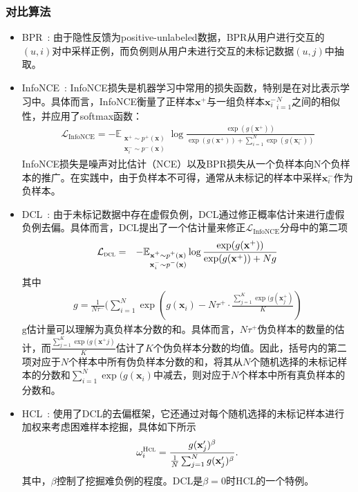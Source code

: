 \subsubsection{对比算法}
\begin{itemize}
	\item BPR~\cite{Steffen:2009:UAI}: 由于隐性反馈为positive-unlabeled数据，BPR从用户进行交互的$(u,i)$对中采样正例，而负例则从用户未进行交互的未标记数据$(u,j)$中抽取。
	\item InfoNCE~\cite{Oord:2018:arxiv}: 
	InfoNCE损失是机器学习中常用的损失函数，特别是在对比表示学习中。具体而言，InfoNCE衡量了正样本$\mathbf{x}^+$与一组负样本${\mathbf{x}_i^-}_{i=1}^N$之间的相似性，并应用了softmax函数：
	\begin{eqnarray}\label{eq:Info}
		\mathcal{L}_\text{InfoNCE} =  - \mathbb{E}_{\substack{\mathbf x^+ \sim p^+(\mathbf x) \\ \mathbf x_i^- \sim p^-(\mathbf x)}} \log\frac{\exp(g(\mathbf{x}^+))}{\exp(g(\mathbf{x}^+))+ \sum_{i=1}^{N}\exp( g(\mathbf{x}_i^-))} \nonumber
	\end{eqnarray}
	InfoNCE损失是噪声对比估计（NCE）以及BPR损失从一个负样本向N个负样本的推广。在实践中，由于负样本不可得，通常从未标记的样本中采样$\mathbf{x}_i^-$作为负样本。
	\item DCL~\cite{Chuang:2020:NIPS}: 由于未标记数据中存在虚假负例，DCL通过修正概率估计来进行虚假负例去偏。具体而言，DCL提出了一个估计量来修正$\mathcal{L}_\text{InfoNCE}$分母中的第二项 
	\begin{eqnarray}\label{eq:DCL}
		\mathcal{L}_\textsc{dcl} 
		&=&  - \mathbb{E}_{\substack{\mathbf x^+ \sim p^+(\mathbf x) \\ \mathbf x_i^- \sim p^-(\mathbf x)}}\log\frac{\exp(g(\mathbf{x}^+))}{\exp(g(\mathbf{x}^+))+ Ng} \nonumber
	\end{eqnarray}
	其中
	\begin{eqnarray}\nonumber
		g =  \frac{1}{N\tau^-}  (\sum_{i=1}^{N} \exp(g(\mathbf{x}_i) - N\tau^+ \cdot \frac{\sum_{j=1}^{K} \exp(g(\mathbf{x}^+_j)}{K} ) \label{Eq:DCLEstimator}
	\end{eqnarray}
	$\text{g}$估计量可以理解为真负样本分数的和。具体而言，$N\tau^+$伪负样本的数量的估计，而$\frac{\sum_{j=1}^{K} \exp(g(\mathbf{x}^+j)}{K}$估计了$K$个伪负样本分数的均值。因此，括号内的第二项对应于$N$个样本中所有伪负样本分数的和，将其从$N$个随机选择的未标记样本的分数和$\sum_{i=1}^{N} \exp(g(\mathbf{x}_i)$中减去，则对应于$N$个样本中所有真负样本的分数和。
	\item HCL~\cite{Robinson:2021:ICLR}: 使用了DCL的去偏框架，它还通过对每个随机选择的未标记样本进行加权来考虑困难样本挖掘，具体如下所示
	\begin{eqnarray}\label{eq:hcl}
		\omega_i^\textsc{Hcl} = \frac{g(\mathbf{x}^\prime_j)^\beta}{\frac{1}{N} \sum_{j=1}^{N}g(\mathbf{x}^\prime_j)^\beta}.
	\end{eqnarray}
	其中，$\beta$控制了挖掘难负例的程度。DCL是$\beta=0$时HCL的一个特例。
\end{itemize}
